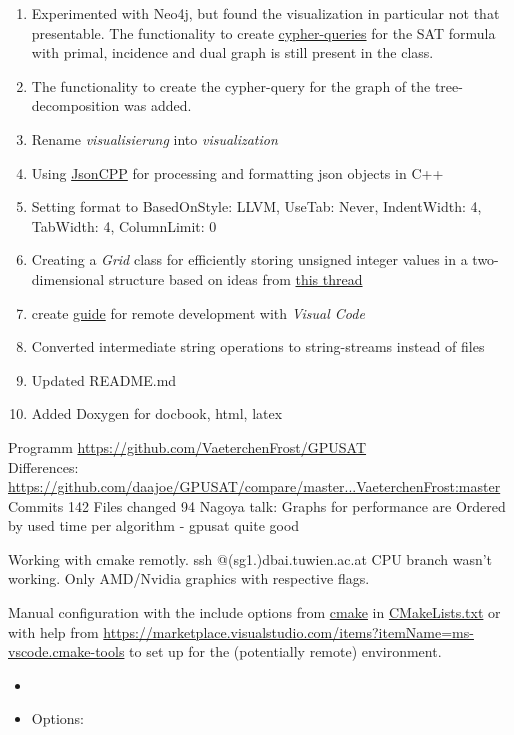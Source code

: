 \documentclass[a4paper, 12pt]{scrartcl}
\begin{document}
\begin{enumerate}
	\item Experimented with Neo4j, but found the visualization in particular not that presentable. The functionality to create \href{https://neo4j.com/developer/cypher-resources/}{cypher-queries} for the SAT formula with primal, incidence and dual graph is still present in the class.
	\item The functionality to create the cypher-query for the graph of the tree-decomposition was added.
	\item Rename \textit{visualisierung} into \textit{visualization}
	\item Using \href{https://github.com/open-source-parsers/jsoncpp}{JsonCPP} for processing and formatting json objects in C++
	\item Setting format to {BasedOnStyle: LLVM, UseTab: Never, IndentWidth: 4, TabWidth: 4, ColumnLimit: 0}
	\item Creating a \emph{Grid} class for efficiently storing unsigned integer values in a two-dimensional structure
	based on ideas from \href{https://stackoverflow.com/questions/936687}{this thread}
	\item create \href{https://github.com/VaeterchenFrost/GPUSAT/blob/master/VisualCodeUsage.md}{guide} for remote development with \emph{Visual Code}
	\item Converted intermediate string operations to string-streams instead of files
	\item Updated README.md
	\item Added Doxygen for docbook, html, latex	
\end{enumerate}
Programm \url{https://github.com/VaeterchenFrost/GPUSAT} \\
Differences: \url{https://github.com/daajoe/GPUSAT/compare/master...VaeterchenFrost:master}  Commits 142 Files changed 94 
Nagoya talk:
Graphs for performance are Ordered by used time per algorithm - gpusat quite good

Working with cmake remotly. ssh @(sg1.)dbai.tuwien.ac.at
CPU branch wasn't working.
Only AMD/Nvidia graphics  with respective flags.

Manual configuration with the include options from \href{https://cmake.org/}{cmake} in \href{https://github.com/VaeterchenFrost/GPUSAT/blob/master/CMakeLists.txt}{CMakeLists.txt}
or with help from \url{https://marketplace.visualstudio.com/items?itemName=ms-vscode.cmake-tools}
to set up for the (potentially remote) environment.

\begin{itemize}
	\item 
	\item Options:
\end{itemize}
\end{document}
